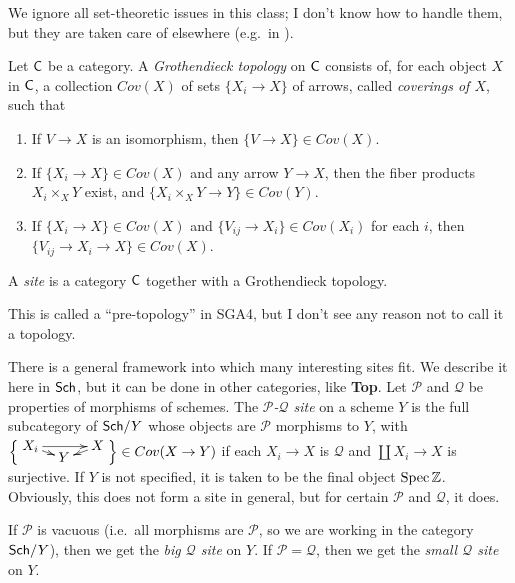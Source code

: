 
We ignore all set-theoretic issues in this class; I don't know how to handle them, but they are taken care of elsewhere (e.g.~in \cite{SGA}).

\begin{definition}
 Let $\text{\sf C}$ be a category. A \emph{Grothendieck topology} on $\text{\sf C}$ consists of, for each object $X$ in $\text{\sf C}$, a collection $Cov(X)$ of sets $\{X_i\to X\}$ of arrows, called \emph{coverings of $X$}, such that
 \begin{enumerate}
  \item If $V\to X$ is an isomorphism, then $\{V\to X\}\in Cov(X)$.
  \item If $\{X_i\to X\}\in Cov(X)$ and any arrow $Y\to X$, then the fiber products $X_i\times_X Y$ exist, and $\{X_i\times_X Y\to Y\}\in Cov(Y)$.
  \item If $\{X_i\to X\}\in Cov(X)$ and $\{V_{ij}\to X_i\}\in Cov(X_i)$ for each $i$,
     then $\{V_{ij}\to X_i\to X\}\in Cov(X)$.
 \end{enumerate}
 A \emph{site} is a category $\text{\sf C}$ together with a Grothendieck topology.
\end{definition}
\begin{remark}
 This is called a ``pre-topology'' in SGA4, but I don't see any reason not to call it a topology.
\end{remark}
There is a general framework into which many interesting sites fit. We describe it here in $\text{\sf Sch}$, but it can be done in other categories, like \textbf{Top}. Let $\mathcal P$ and $\mathcal Q$ be properties of morphisms of schemes. The \emph{$\mathcal P$-$\mathcal Q$ site} on a scheme $Y$ is the full subcategory of $\text{\sf Sch}/Y$ whose objects are $\mathcal P$ morphisms to $Y$, with $\Bigl\{\raisebox{1ex}{$\xymatrix@!0 @R=2ex @C=2pc{ X_i \ar[rr] \ar[dr] & & X\ar[dl]\\ & Y}$}\Bigr\}\in Cov(X\to Y)$ if each $X_i\to X$ is $\mathcal Q$ and $\coprod X_i\to X$ is surjective. If $Y$ is not specified, it is taken to be the final object $\operatorname{Spec} \mathbb{Z}$. Obviously, this does not form a site in general, but for certain $\mathcal P$ and $\mathcal Q$, it does.
\begin{example}
 If $\mathcal P$ is vacuous (i.e.~all morphisms are $\mathcal P$, so we are working in the category $\text{\sf Sch}/Y$), then we get the \emph{big $\mathcal Q$ site} on $Y$. If $\mathcal P=\mathcal Q$, then we get the \emph{small $\mathcal Q$ site} on $Y$.
\end{example}
